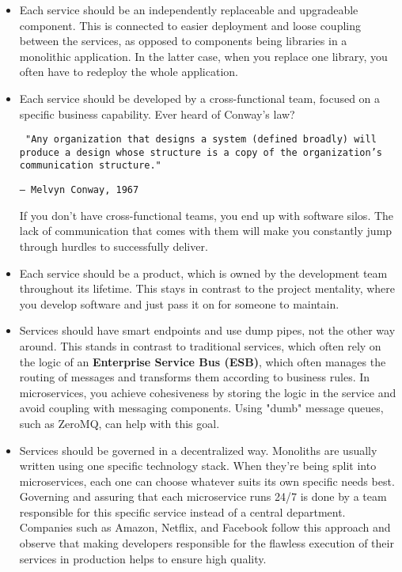 \begin{itemize}
\item	
Each service should be an independently replaceable and upgradeable component. This is connected to easier deployment and loose coupling between the services, as opposed to components being libraries in a monolithic application. In the latter case, when you replace one library, you often have to redeploy the whole application.


\item
Each service should be developed by a cross-functional team, focused on a specific business capability. Ever heard of Conway's law?

\begin{flushleft}
\tt
"Any organization that designs a system (defined broadly) will produce a design whose structure is a copy of the organization's communication structure."
\end{flushleft}
\begin{flushright}
\texttt{– Melvyn Conway, 1967}
\end{flushright}

If you don't have cross-functional teams, you end up with software silos. The lack of communication that comes with them will make you constantly jump through hurdles to successfully deliver.


\item
Each service should be a product, which is owned by the development team throughout its lifetime. This stays in contrast to the project mentality, where you develop software and just pass it on for someone to maintain.

\item
Services should have smart endpoints and use dump pipes, not the other way around. This stands in contrast to traditional services, which often rely on the logic of an \textbf{Enterprise Service Bus (ESB)}, which often manages the routing of messages and transforms them according to business rules. In microservices, you achieve cohesiveness by storing the logic in the service and avoid coupling with messaging components. Using "dumb" message queues, such as ZeroMQ, can help with this goal.


\item
Services should be governed in a decentralized way. Monoliths are usually written using one specific technology stack. When they're being split into microservices, each one can choose whatever suits its own specific needs best. Governing and assuring that each microservice runs 24/7 is done by a team responsible for this specific service instead of a central department. Companies such as Amazon, Netflix, and Facebook follow this approach and observe that making developers responsible for the flawless execution of their services in production helps to ensure high quality.



\end{itemize}
